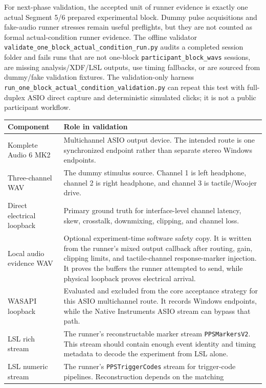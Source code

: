 \documentclass[11pt]{article}
\begin{document}
For next-phase validation, the accepted unit of runner evidence is exactly one
actual Segment 5/6 prepared experimental block. Dummy pulse acquisitions and
fake-audio runner stresses remain useful preflights, but they are not counted
as formal actual-condition runner evidence. The offline validator
\texttt{validate\_one\_block\_actual\_condition\_run.py} audits a completed
session folder and fails runs that are not one-block
\texttt{participant\_block\_wavs} sessions, are missing analysis/XDF/LSL
outputs, use timing fallbacks, or are sourced from dummy/fake validation
fixtures. The validation-only harness
\texttt{run\_one\_block\_actual\_condition\_validation.py} can repeat this
test with full-duplex ASIO direct capture and deterministic simulated clicks;
it is not a public participant workflow.

\begin{longtable}{|p{}|p{}|}
\hline
\textbf{Component} & \textbf{Role in validation} \\
\hline
Komplete Audio 6 MK2 & Multichannel ASIO output device. The intended route is
one synchronized endpoint rather than separate stereo Windows endpoints. \\
\hline
Three-channel WAV & The dummy stimulus source. Channel 1 is left headphone,
channel 2 is right headphone, and channel 3 is tactile/Woojer drive. \\
\hline
Direct electrical loopback & Primary ground truth for interface-level channel
latency, skew, crosstalk, downmixing, clipping, and channel loss. \\
\hline
Local audio evidence WAV & Optional experiment-time software safety copy. It is
written from the runner's mixed output callback after routing, gain, clipping
limits, and tactile-channel response-marker injection. It proves the buffers the
runner attempted to send, while physical loopback proves electrical arrival. \\
\hline
WASAPI loopback & Evaluated and excluded from the core acceptance strategy for
this ASIO multichannel route. It records Windows endpoints, while the Native
Instruments ASIO stream can bypass that path. \\
\hline
LSL rich stream & The runner's reconstructable marker stream
\texttt{PPSMarkersV2}. This stream should contain enough event identity and
timing metadata to decode the experiment from LSL alone. \\
\hline
LSL numeric stream & The runner's \texttt{PPSTriggerCodes} stream for
trigger-code pipelines. Reconstruction depends on the matching

\end{longtable}
\end{document}
